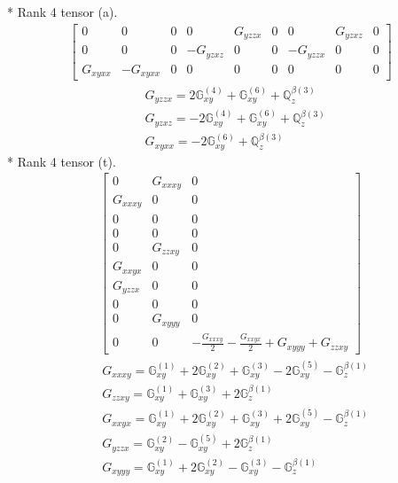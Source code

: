 \documentclass[fleqn,8pt,landscape]{jsarticle}
\begin{document}
* Rank 4 tensor (a).
\begin{align*}
\begin{bmatrix} 0 & 0 & 0 & 0 & G_{yzzx} & 0 & 0 & G_{yzxz} & 0 \\ 0 & 0 & 0 & - G_{yzxz} & 0 & 0 & - G_{yzzx} & 0 & 0 \\ G_{xyxx} & - G_{xyxx} & 0 & 0 & 0 & 0 & 0 & 0 & 0 \end{bmatrix}
\end{align*}
\begin{align*}
& G_{yzzx} = 2 \mathbb{G}_{xy}^{(4)} + \mathbb{G}_{xy}^{(6)} + \mathbb{Q}_{z}^{\beta(3)} \\
& G_{yzxz} = - 2 \mathbb{G}_{xy}^{(4)} + \mathbb{G}_{xy}^{(6)} + \mathbb{Q}_{z}^{\beta(3)} \\
& G_{xyxx} = - 2 \mathbb{G}_{xy}^{(6)} + \mathbb{Q}_{z}^{\beta(3)}
\end{align*}
* Rank 4 tensor (t).
\begin{align*}
\begin{bmatrix} 0 & G_{xxxy} & 0 \\ G_{xxxy} & 0 & 0 \\ 0 & 0 & 0 \\ 0 & 0 & 0 \\ 0 & G_{zzxy} & 0 \\ G_{xxyx} & 0 & 0 \\ G_{yzzx} & 0 & 0 \\ 0 & 0 & 0 \\ 0 & G_{xyyy} & 0 \\ 0 & 0 & - \frac{G_{xxxy}}{2} - \frac{G_{xxyx}}{2} + G_{xyyy} + G_{zzxy} \end{bmatrix}
\end{align*}
\begin{align*}
& G_{xxxy} = \mathbb{G}_{xy}^{(1)} + 2 \mathbb{G}_{xy}^{(2)} + \mathbb{G}_{xy}^{(3)} - 2 \mathbb{G}_{xy}^{(5)} - \mathbb{G}_{z}^{\beta(1)} \\
& G_{zzxy} = \mathbb{G}_{xy}^{(1)} + \mathbb{G}_{xy}^{(3)} + 2 \mathbb{G}_{z}^{\beta(1)} \\
& G_{xxyx} = \mathbb{G}_{xy}^{(1)} + 2 \mathbb{G}_{xy}^{(2)} + \mathbb{G}_{xy}^{(3)} + 2 \mathbb{G}_{xy}^{(5)} - \mathbb{G}_{z}^{\beta(1)} \\
& G_{yzzx} = \mathbb{G}_{xy}^{(2)} - \mathbb{G}_{xy}^{(5)} + 2 \mathbb{G}_{z}^{\beta(1)} \\
& G_{xyyy} = \mathbb{G}_{xy}^{(1)} + 2 \mathbb{G}_{xy}^{(2)} - \mathbb{G}_{xy}^{(3)} - \mathbb{G}_{z}^{\beta(1)}
\end{align*}
\end{document}
